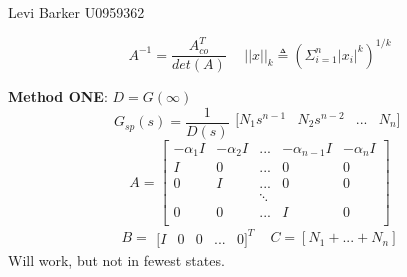\documentclass[twocolumn]{article}    %
\begin{document}
\vspace{30pt}
\begin{center}
    Levi Barker \hspace{35pt} U0959362
\end{center}



\newpage 
\begin{equation*}
    A^{-1} = \frac{A_{co}^T}{det(A)} \hspace{15pt} ||x||_k \triangleq \left( \Sigma_{i=1}^n |x_i|^k \right)^{1/k}
\end{equation*}


\noindent
\textbf{Method ONE}: \hspace{60pt} \(D = G(\infty)\)
\begin{equation*}
    G_{sp}(s) = \frac{1}{D(s)}
    \begin{matrix}
        [N_1s^{n-1} & N_2s^{n-2} & ... & N_n]\\
    \end{matrix} 
\end{equation*}
\begin{equation*}
    A = \begin{bmatrix}
        -\alpha_1I & -\alpha_2I & ... & -\alpha_{n-1}I & -\alpha_nI \\
        I & 0 & ... & 0 & 0 \\
        0 & I & ...& 0 & 0 \\
          &   & \ddots &  & \\
        0 & 0 & ... & I & 0\\
    \end{bmatrix}
\end{equation*}
\begin{equation*}
    B = \begin{matrix}
        [I & 0 & 0 & ... & 0]^T
    \end{matrix} \hspace{9pt} C =[N_1 + ... + N_n]
\end{equation*}
Will work, but not in fewest states.
\end{document}
